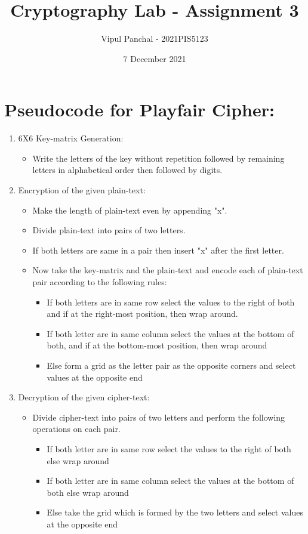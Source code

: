 \documentclass{article}
\title{Cryptography Lab - Assignment 3}
\author{Vipul Panchal - 2021PIS5123}
\date{7 December 2021}
\begin{document}
\maketitle

\section{Pseudocode for Playfair Cipher:}

\begin{enumerate}
    \item 6X6 Key-matrix Generation:
    \begin{itemize}
        \item Write the letters of the key without repetition followed by remaining letters in alphabetical order then followed by digits.
    \end{itemize}
    \item Encryption of the given plain-text:
    \begin{itemize}
        \item Make the length of plain-text even by appending "x".
        \item Divide plain-text into pairs of two letters.
        \item If both letters are same in a pair then insert "x" after the first letter.
        \item Now take the key-matrix and the plain-text and encode each of plain-text pair according to the following rules:
        \begin{itemize}
            \item If both letters are in same row select the values to the right of both and if at the right-most position, then wrap around.
            \item If both letter are in same column select the values at the bottom of both, and if at the bottom-most position, then wrap around  
            \item Else form a grid as the letter pair as the opposite corners and select values at the opposite end
        \end{itemize}
    \end{itemize}
    
    \item Decryption of the given cipher-text:
    \begin{itemize}
        \item Divide cipher-text into pairs of two letters and perform the following operations on each pair.
        \begin{itemize}
            \item If both letter are in same row select the values to the right of both else wrap around  
            \item If both letter are in same column select the values at the bottom of both else wrap around  
            \item Else take the grid which is formed by the two letters and select values at the opposite end
        \end{itemize}
    \end{itemize}
\end{enumerate}
\end{document}
